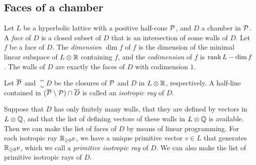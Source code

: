 \documentclass{amsart}
\numberwithin{procedure}{section}
\begin{document}
\subsection{Faces of a chamber}\label{subsec:faces}
%
Let $L$ be a hyperbolic lattice
with a positive half-cone $\mathord{\mathcal P}$,
and $D$ a chamber in $\mathord{\mathcal P}$.
A \emph{face} of $D$ is a closed subset of $D$
that is an intersection of some walls of $D$.
Let $f$ be a face of $D$.
The \emph{dimension $\dim f$}  of $f$ is the dimension
of the minimal linear subspace of $L\otimes\mathord{\mathbb R}$ containing $f$,
and the \emph{codimension} of $f$ is $\operatorname{\mathrm{rank}}\nolimits L-\dim f$.
The walls of $D$ are exactly the faces of $D$ with codimension $1$.
\par
Let $\overline{\mathord{\mathcal P}}$ and $\closure{D}$ be the closures
of $\mathord{\mathcal P}$ and $D$ in $L\otimes\mathord{\mathbb R}$, respectively.
A half-line contained in
$(\overline{\mathord{\mathcal P}}\setminus \mathord{\mathcal P}) \cap \overline{D}$
is called an \emph{isotropic ray} of $D$.
\par
Suppose that $D$ has only finitely many walls,
that they are defined by vectors in $L\otimes\mathord{\mathbb Q}$,
and that the list of defining vectors of these walls in $L\otimes\mathord{\mathbb Q}$ is available.
Then we can make the list of faces of $D$
by means of linear programming.
For each isotropic ray $\mathord{\mathbb R}_{\ge 0}v $,
we have a unique primitive vector $v\in L$ that generates $\mathord{\mathbb R}_{\ge 0}v $,
which we call  a \emph{primitive isotropic ray} of $D$.
We can also make the list of primitive isotropic rays of $D$.
%
%
\end{document}
